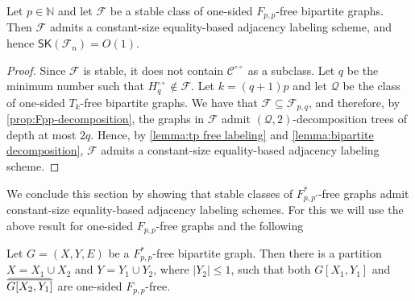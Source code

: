 \documentclass{theoretics}
\newcommand{\cC}{\ensuremath{\mathcal{C}}}
\newcommand{\cF}{\ensuremath{\mathcal{F}}}
\newcommand{\cQ}{\ensuremath{\mathcal{Q}}}
\newcommand\doverline[1]{%
  \setbox0=\hbox{$\!\overline{#1}\!$}%
  \ht0=\dimexpr\ht0-.2ex\relax%
  \,\overline{\copy0}\,%
}
\newcommand{\bc}[1]{\doverline{#1}} %
\newcommand{\RL}{\mathsf{SK}}
\newcommand{\dcirc}{{\circ\circ}}
\begin{document}
\begin{lemma}
\label{lemma:Fpq labeling scheme}
Let $p \in \mathbb{N}$ and let $\cF$ be a stable class of one-sided $F_{p,p}$-free bipartite graphs.
Then $\cF$ admits a constant-size equality-based adjacency labeling scheme, and hence $\RL(\cF_n) = O(1)$.
\end{lemma}
\begin{proof}
	Since $\cF$ is stable, it does not contain $\cC^\dcirc$ as a subclass.
	Let $q$ be the minimum number such that $H^{\circ\circ}_q \not\in \cF$.
	Let $k = (q+1)p$ and let $\cQ$ be the class of one-sided $T_k$-free bipartite graphs.
	We have that $\cF \subseteq \cF_{p,q}$, and therefore, by \cref{prop:Fpp-decomposition}, the graphs in $\cF$ admit $(\cQ,2)$-decomposition trees of depth at most $2q$.
	Hence, by \cref{lemma:tp free labeling} and \cref{lemma:bipartite decomposition},
	$\cF$ admits a constant-size equality-based adjacency labeling scheme.
\end{proof}

We conclude this section by showing that stable classes of $F^*_{p,p'}$-free graphs admit
constant-size equality-based adjacency labeling schemes. For this we will use the above result for
one-sided $F_{p,p}$-free graphs and the following

\begin{proposition}
\label{prop:allen F*}
Let $G = (X,Y,E)$ be a $F^*_{p,p}$-free bipartite graph. Then there is a partition $X = X_1 \cup
X_2$ and $Y = Y_1 \cup Y_2$, where $|Y_2| \leq 1$, such that both $G[X_1,Y_1]$ and $\bc{G[X_2,Y_1]}$ are one-sided $F_{p,p}$-free.
\end{proposition}
\end{document}
